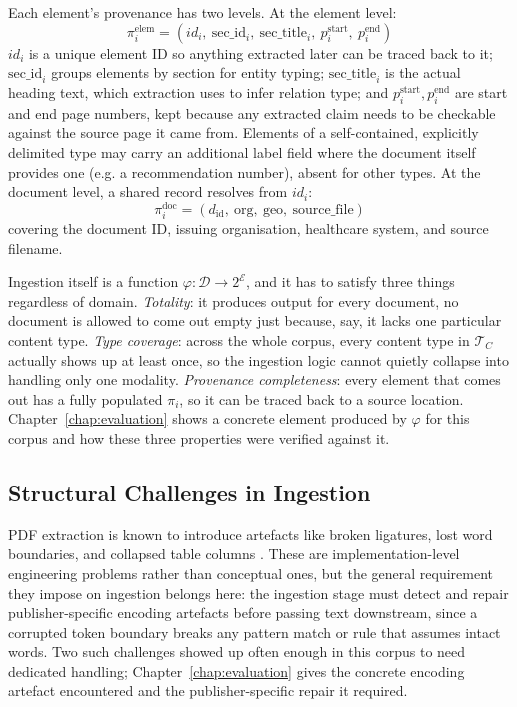 Each element's provenance has two levels. At the element level:
$$\pi_i^{\text{elem}} = (id_i,\ \text{sec\_id}_i,\ \text{sec\_title}_i,\ p_i^{\text{start}},\ p_i^{\text{end}})$$
$id_i$ is a unique element ID so anything extracted later can be traced back to it; $\text{sec\_id}_i$ groups elements by section for entity typing; $\text{sec\_title}_i$ is the actual heading text, which extraction uses to infer relation type; and $p_i^{\text{start}}, p_i^{\text{end}}$ are start and end page numbers, kept because any extracted claim needs to be checkable against the source page it came from. Elements of a self-contained, explicitly delimited type may carry an additional label field where the document itself provides one (e.g. a recommendation number), absent for other types. At the document level, a shared record resolves from $id_i$:
$$\pi_i^{\text{doc}} = (d_{\text{id}},\ \text{org},\ \text{geo},\ \text{source\_file})$$
covering the document ID, issuing organisation, healthcare system, and source filename.

Ingestion itself is a function $\varphi: \mathcal{D} \rightarrow 2^{\mathcal{E}}$, and it has to satisfy three things regardless of domain. \textit{Totality}: it produces output for every document, no document is allowed to come out empty just because, say, it lacks one particular content type. \textit{Type coverage}: across the whole corpus, every content type in $\mathcal{T}_C$ actually shows up at least once, so the ingestion logic cannot quietly collapse into handling only one modality. \textit{Provenance completeness}: every element that comes out has a fully populated $\pi_i$, so it can be traced back to a source location. Chapter~\ref{chap:evaluation} shows a concrete element produced by $\varphi$ for this corpus and how these three properties were verified against it.

\subsection{Structural Challenges in Ingestion}
\label{sec:ingestion-challenges}

PDF extraction is known to introduce artefacts like broken ligatures, lost word boundaries, and collapsed table columns \cite{bast2017,auer2024}. These are implementation-level engineering problems rather than conceptual ones, but the general requirement they impose on ingestion belongs here: the ingestion stage must detect and repair publisher-specific encoding artefacts before passing text downstream, since a corrupted token boundary breaks any pattern match or rule that assumes intact words. Two such challenges showed up often enough in this corpus to need dedicated handling; Chapter~\ref{chap:evaluation} gives the concrete encoding artefact encountered and the publisher-specific repair it required.

